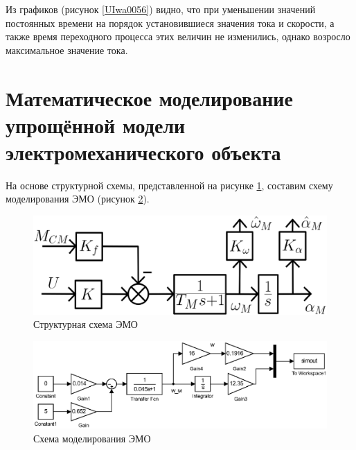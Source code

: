 \documentclass[12pt,a4paper]{article}
\begin{document}
Из графиков (рисунок \ref{UIwa0056}) видно, что при уменьшении значений постоянных времени на порядок установившиеся значения тока и скорости, а также время переходного процесса этих величин не изменились, однако возросло максимальное значение тока.

\newpage
\section{Математическое моделирование упрощённой модели электромеханического объекта}	 
На основе структурной схемы, представленной на рисунке \ref{simpScheme}, составим схему моделирования ЭМО (рисунок \ref{cxema2}).
\begin{figure}[ht!]
	\centering
	\includegraphics[width = \textwidth]{simpScheme}
	\caption{Структурная схема ЭМО}
	\label{simpScheme}
\end{figure}
\begin{figure}[ht!]
	\centering
	\includegraphics[width = \textwidth]{cxema2}
	\caption{Схема моделирования ЭМО}
	\label{cxema2}
\end{figure}
\end{document}
